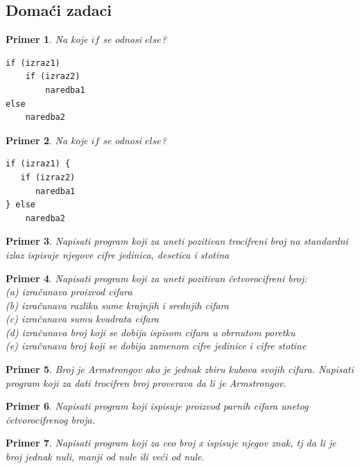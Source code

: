 \documentclass[a4paper]{article}
\newtheorem{primer}{Primer}[section]
\begin{document}
\subsection{Domaći zadaci}
\begin{primer}
Na koje $if$ se odnosi $else$?
\begin{verbatim}
if (izraz1)
    if (izraz2)
        naredba1
else
    naredba2
\end{verbatim}
\end{primer}
\begin{primer}
Na koje $if$ se odnosi $else$?
\begin{verbatim}
if (izraz1) {
   if (izraz2)
      naredba1
} else
    naredba2
\end{verbatim}
\end{primer}

\begin{primer}
Napisati program koji za uneti pozitivan trocifreni broj na
standardni izlaz ispisuje njegove cifre jedinica, desetica i stotina
\end{primer}

\begin{primer}
Napisati program koji za uneti pozitivan četvorocifreni
broj:\\
(a) izračunava proizvod cifara\\
(b) izračunava razliku sume krajnjih i srednjih cifara\\
(c) izračunava sumu kvadrata cifara\\
(d) izračunava broj koji se dobija ispisom cifara u obrnutom poretku\\
(e) izračunava broj koji se dobija zamenom cifre jedinice i cifre stotine\\
\end{primer}

\begin{primer}
Broj je Armstrongov ako je jednak zbiru kubova svojih
cifara. Napisati program koji za dati trocifren broj proverava da li je Armstrongov.
\end{primer}

\begin{primer}
Napisati program koji ispisuje proizvod parnih cifara unetog
četvorocifrenog broja.
\end{primer}

\begin{primer}
Napisati program koji za ceo broj x ispisuje njegov
znak, tj da li je broj jednak nuli, manji od nule ili veći od nule.
\end{primer}
\end{document}
